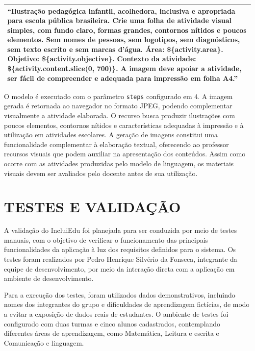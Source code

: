 \begin{quadro}[H]
\centering
\caption{\textit{Prompt} utilizado na geração de imagens pedagógicas}
\label{qua:prompt-imagem}
\begin{tabular}{|p{14cm}|}
\hline
“Ilustração pedagógica infantil, acolhedora, inclusiva e apropriada para escola pública brasileira. Crie uma folha de atividade visual simples, com fundo claro, formas grandes, contornos nítidos e poucos elementos. Sem nomes de pessoas, sem logotipos, sem diagnósticos, sem texto escrito e sem marcas d'água. Área: \$\{activity.area\}. Objetivo: \$\{activity.objective\}. Contexto da atividade: \$\{activity.content.slice(0, 700)\}. A imagem deve apoiar a atividade, ser fácil de compreender e adequada para impressão em folha A4.” \\
\hline
\end{tabular}
\end{quadro}

O modelo é executado com o parâmetro \texttt{steps} configurado em 4. A imagem gerada é retornada ao navegador no formato JPEG, podendo complementar visualmente a atividade elaborada. O recurso busca produzir ilustrações com poucos elementos, contornos nítidos e características adequadas à impressão e à utilização em atividades escolares. A geração de imagens constitui uma funcionalidade complementar à elaboração textual, oferecendo ao professor recursos visuais que podem auxiliar na apresentação dos conteúdos. Assim como ocorre com as atividades produzidas pelo modelo de linguagem, os materiais visuais devem ser avaliados pelo docente antes de sua utilização.

\section{TESTES E VALIDAÇÃO}
\label{sec:testes-validacao}

A validação do IncluiEdu foi planejada para ser conduzida por meio de testes manuais, com o objetivo de verificar o funcionamento das principais funcionalidades da aplicação à luz dos requisitos definidos para o sistema. Os testes foram realizados por Pedro Henrique Silvério da Fonseca, integrante da equipe de desenvolvimento, por meio da interação direta com a aplicação em ambiente de desenvolvimento.

Para a execução dos testes, foram utilizados dados demonstrativos, incluindo nomes dos integrantes do grupo e dificuldades de aprendizagem fictícias, de modo a evitar a exposição de dados reais de estudantes. O ambiente de testes foi configurado com duas turmas e cinco alunos cadastrados, contemplando diferentes áreas de aprendizagem, como Matemática, Leitura e escrita e Comunicação e linguagem.

